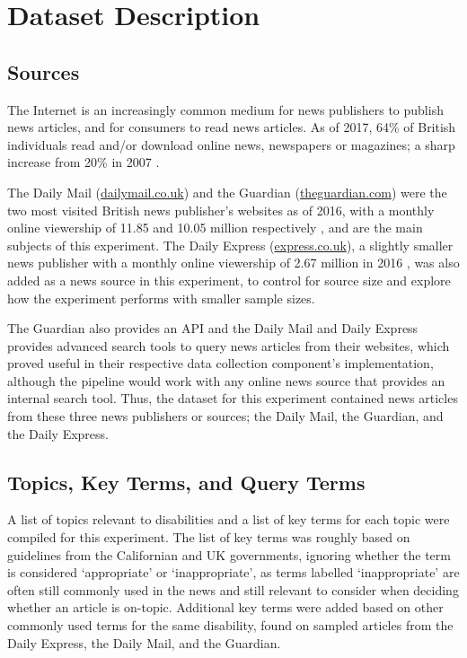 \documentclass{report}
\begin{document}
\section{Dataset Description} \label{Dataset Description}  %

\subsection{Sources} \label{sources}

The Internet is an increasingly common medium for news publishers to publish news articles, and for consumers to read news articles.
As of 2017, 64\% of British individuals read and/or download online news, newspapers or magazines; a sharp increase from 20\% in 2007 \cite{statista2018share}. 

The Daily Mail (\url{dailymail.co.uk}) and the Guardian (\url{theguardian.com}) were the two most visited British news publisher's websites as of 2016, with a monthly online viewership of 11.85 and 10.05 million respectively \cite{statista2018newspaper}, and are the main subjects of this experiment.
The Daily Express (\url{express.co.uk}), a slightly smaller news publisher with a monthly online viewership of 2.67 million in 2016 \cite{statista2018newspaper}, was also added as a news source in this experiment, to control for source size and explore how the experiment performs with smaller sample sizes.

The Guardian also provides an API \cite{guardian} and the Daily Mail and Daily Express provides advanced search tools \cite{daily-mail, daily-express} to query news articles from their websites, which proved useful in their respective data collection component's implementation, although the pipeline would work with any online news source that provides an internal search tool.
Thus, the dataset for this experiment contained news articles from these three news publishers or sources; the Daily Mail, the Guardian, and the Daily Express.

\subsection{Topics, Key Terms, and Query Terms} \label{topics}

A list of topics relevant to disabilities and a list of key terms for each topic were compiled for this experiment.
The list of key terms was roughly based on guidelines from the Californian \cite{ca-guideline} and UK \cite{uk-guideline} governments, ignoring whether the term is considered `appropriate' or `inappropriate', as terms labelled `inappropriate' are often still commonly used in the news and still relevant to consider when deciding whether an article is on-topic. 
Additional key terms were added based on other commonly used terms for the same disability, found on sampled articles from the Daily Express, the Daily Mail, and the Guardian.
\end{document}
